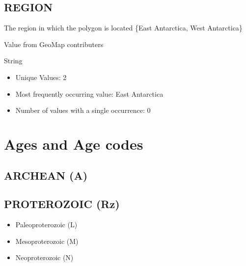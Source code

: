 \documentclass[letterpaper,10pt,english]{sphinxmanual}
\begin{document}
\subsection{REGION}
\label{\detokenize{field_glossary:region}}
The region in which the polygon is located \{East Antarctica, West Antarctica\}

Value from GeoMap contributers

String


\begin{itemize}
\item {} 
Unique Values: 2

\item {} 
Most frequently occurring value: East Antarctica

\item {} 
Number of values with a single occurrence: 0

\end{itemize}


\section{Ages and Age codes}
\label{\detokenize{legend:ages-and-age-codes}}\label{\detokenize{legend::doc}}

\subsection{ARCHEAN (A)}
\label{\detokenize{legend:archean-a}}

\subsection{PROTEROZOIC (Rz)}
\label{\detokenize{legend:proterozoic-rz}}\begin{itemize}
\item {} 
Paleoproterozoic (L)

\item {} 
Mesoproterozoic (M)

\item {} 
Neoproterozoic (N)

\end{itemize}
\end{document}
